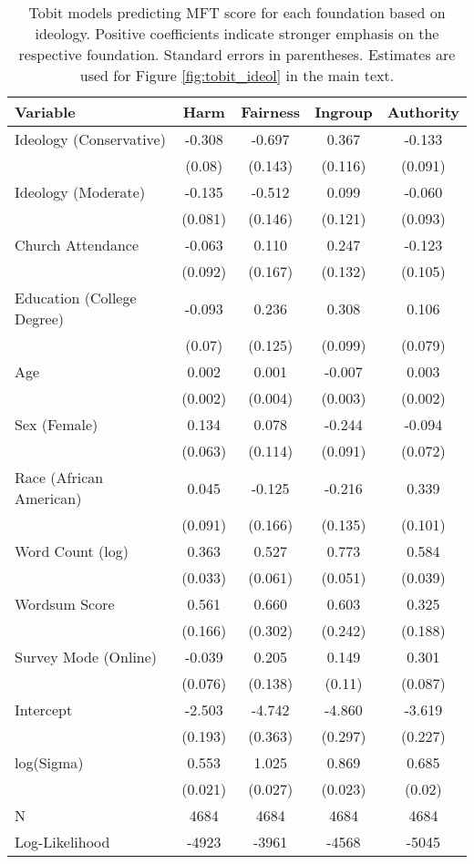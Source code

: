 \begin{table}[ht]
\centering
\caption{Tobit models predicting MFT score for each foundation based 
           on ideology. Positive coefficients indicate stronger emphasis on the respective 
           foundation. Standard errors in parentheses. Estimates are used for Figure 
           \ref{fig:tobit_ideol} in the main text.} 
\label{tab:tobit_ideol}
\begingroup\footnotesize
\begin{tabular}{lcccc}
  \hline
Variable & Harm & Fairness & Ingroup & Authority \\ 
  \hline
Ideology (Conservative) & -0.308 & -0.697 &  0.367 & -0.133 \\ 
   & (0.08) & (0.143) & (0.116) & (0.091) \\ 
  Ideology (Moderate) & -0.135 & -0.512 &  0.099 & -0.060 \\ 
   & (0.081) & (0.146) & (0.121) & (0.093) \\ 
  Church Attendance & -0.063 &  0.110 &  0.247 & -0.123 \\ 
   & (0.092) & (0.167) & (0.132) & (0.105) \\ 
  Education (College Degree) & -0.093 &  0.236 &  0.308 &  0.106 \\ 
   & (0.07) & (0.125) & (0.099) & (0.079) \\ 
  Age &  0.002 &  0.001 & -0.007 &  0.003 \\ 
   & (0.002) & (0.004) & (0.003) & (0.002) \\ 
  Sex (Female) &  0.134 &  0.078 & -0.244 & -0.094 \\ 
   & (0.063) & (0.114) & (0.091) & (0.072) \\ 
  Race (African American) &  0.045 & -0.125 & -0.216 &  0.339 \\ 
   & (0.091) & (0.166) & (0.135) & (0.101) \\ 
  Word Count (log) &  0.363 &  0.527 &  0.773 &  0.584 \\ 
   & (0.033) & (0.061) & (0.051) & (0.039) \\ 
  Wordsum Score &  0.561 &  0.660 &  0.603 &  0.325 \\ 
   & (0.166) & (0.302) & (0.242) & (0.188) \\ 
  Survey Mode (Online) & -0.039 &  0.205 &  0.149 &  0.301 \\ 
   & (0.076) & (0.138) & (0.11) & (0.087) \\ 
  Intercept & -2.503 & -4.742 & -4.860 & -3.619 \\ 
   & (0.193) & (0.363) & (0.297) & (0.227) \\ 
  log(Sigma) &  0.553 &  1.025 &  0.869 &  0.685 \\ 
   & (0.021) & (0.027) & (0.023) & (0.02) \\ 
   \hline
N & 4684 & 4684 & 4684 & 4684 \\ 
  Log-Likelihood & -4923 & -3961 & -4568 & -5045 \\ 
   \hline
\end{tabular}
\endgroup
\end{table}
